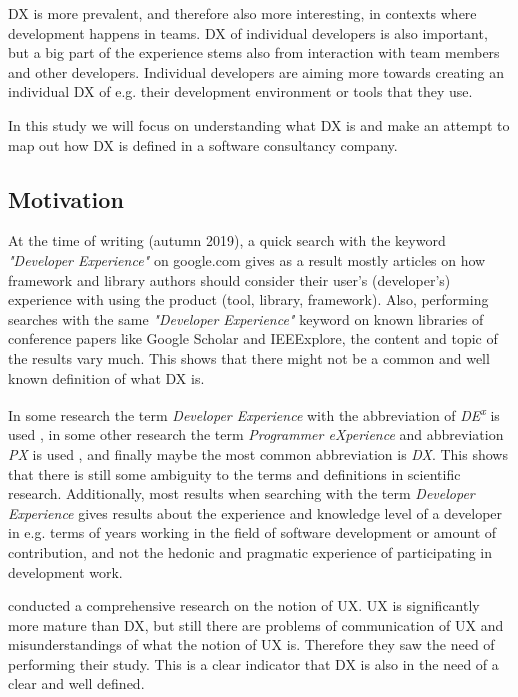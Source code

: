 \documentclass[english, 12pt, a4paper, sci, utf8, a-1b, online]{aaltothesis}
\newcommand{\now}{autumn 2019}
\begin{document}
DX is more prevalent, and therefore also more interesting, in contexts where development happens in teams. DX of individual developers is also important, but a big part of the experience stems also from interaction with team members and other developers. Individual developers are aiming more towards creating an individual DX of e.g. their development environment or tools that they use.

In this study we will focus on understanding what DX is and make an attempt to map out how DX is defined in a software consultancy company.

\thispagestyle{empty}

\subsection{Motivation} \label{motivation}

At the time of writing (\now), a quick search with the keyword \textit{"Developer Experience"} on google.com gives as a result mostly articles on how framework and library authors should consider their user's (developer's) experience with using the product (tool, library, framework). Also, performing searches with the same \textit{"Developer Experience"} keyword on known libraries of conference papers like Google Scholar and IEEExplore, the content and topic of the results vary much. This shows that there might not be a common and well known definition of what DX is.

In some research the term \textit{Developer Experience} with the abbreviation of \textit{DE\textsuperscript{x}} is used \citep{fagerholm-dx-concept-and-definition}, in some other research the term \textit{Programmer eXperience} and abbreviation \textit{PX} is used \citep{programmer-experience}, and finally maybe the most common abbreviation is \textit{DX}. This shows that there is still some ambiguity to the terms and definitions in scientific research. Additionally, most results when searching with the term \textit{Developer Experience} gives results about the experience and knowledge level of a developer in e.g. terms of years working in the field of software development or amount of contribution, and not the hedonic and pragmatic experience of participating in development work.

\cite{understanding-ux} conducted a comprehensive research on the notion of UX. UX is significantly more mature than DX, but still there are problems of communication of UX and misunderstandings of what the notion of UX is. Therefore they saw the need of performing their study. This is a clear indicator that DX is also in the need of a clear and well defined.
\end{document}

